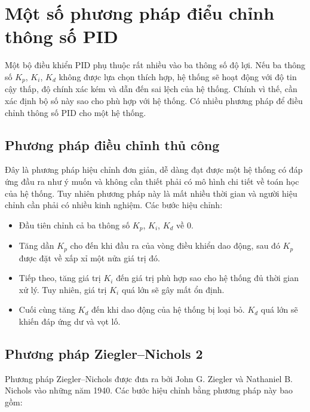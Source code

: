 \section{Một số phương pháp điểu chỉnh thông số PID}

Một bộ điều khiển PID phụ thuộc rất nhiều vào ba thông số độ lợi. Nếu ba thông số $K_p$, $K_i$, $K_d$ không được lựa chọn thích hợp, hệ thống sẽ hoạt động với độ tin cậy thấp, độ chính xác kém và dẫn đến sai lệch của hệ thống. Chính vì thế, cần xác định bộ số này sao cho phù hợp với hệ thống. Có nhiều phương pháp để điều chỉnh thông số PID cho một hệ thống.

\subsection{Phương pháp điều chỉnh thủ công}

Đây là phương pháp hiệu chỉnh đơn giản, dễ dàng đạt được một hệ thống có đáp ứng đầu ra như ý muốn và không cần thiết phải có mô hình chi tiết về toán học của hệ thống. Tuy nhiên phương pháp này là mất nhiều thời gian và người hiệu chỉnh cần phải có nhiều kinh nghiệm. Các bước hiệu chỉnh:

\begin{itemize}	
	\item Đầu tiên chỉnh cả ba thông số $K_p$, $K_i$, $K_d$ về 0. 
	\item Tăng dần $K_p$ cho đến khi đầu ra của vòng điều khiển dao động, sau đó $K_p$ được đặt về xấp xỉ một nửa giá trị đó.
	\item Tiếp theo, tăng giá trị $K_i$ đến giá trị phù hợp sao cho hệ thống đủ thời gian xử lý. Tuy nhiên, giá trị $K_i$ quá lớn sẽ gây mất ổn định.
	\item Cuối cùng tăng $K_d$ đến khi dao động của hệ thống bị loại bỏ. $K_d$ quá lớn sẽ khiến đáp ứng dư và vọt lố.
\end{itemize}

\subsection{Phương pháp Ziegler–Nichols 2}
Phương pháp Ziegler–Nichols được đưa ra bởi John G. Ziegler và Nathaniel B. Nichols vào những năm 1940. Các bước hiệu chỉnh bằng phương pháp này bao gồm:

